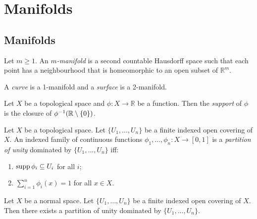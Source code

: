 \chapter{Manifolds}

\section{Manifolds}

 \begin{df}[Manifold]
  Let $m \geq 1$. An \emph{$m$-manifold} is a second countable Hausdorff space
such that each point has a neighbourhood that is homeomorphic to an open subset
of $\mathbb{R}^m$.

A \emph{curve} is a 1-manifold and a \emph{surface} is a 2-manifold.
\end{df}

 \begin{df}[Support]
  Let $X$ be a topological space and $\phi : X \rightarrow \mathbb{R}$ be a
  function. Then the \emph{support} of $\phi$ is the closure of
  ${\phi}^{-1}(\mathbb{R} \setminus \{ 0 \})$.
\end{df}

 \begin{df}
  Let $X$ be a topological space. Let $\{ U_1, \ldots, U_n \}$ be a finite
indexed open covering of $X$. An indexed family of continuous functions
$\phi_1, \ldots, \phi_n : X \rightarrow [0,1]$ is a \emph{partition of unity}
dominated by $\{ U_1, \ldots, U_n \}$ iff:
\begin{enumerate}
\item $\operatorname{supp} \phi_i \subseteq U_i$ for all $i$;
\item $\sum_{i=1}^n \phi_i(x) = 1$ for all $x \in X$.
\end{enumerate}
\end{df}

 \begin{thm}
   \label{thm:topology:manifolds:partition}
  Let $X$ be a normal space.
  Let $\{ U_1, \ldots, U_n \}$ be a finite indexed open covering of $X$. Then
  there exists a partition of unity dominated by $\{ U_1, \ldots, U_n \}$.
\end{thm}

